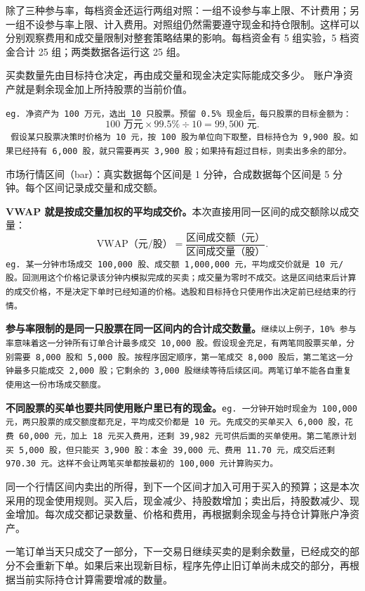 \documentclass[UTF8,fontset=fandol,11pt,a4paper]{ctexart}
\begin{document}
\normalsize
除了三种参与率，每档资金还运行两组对照：一组不设参与率上限、不计费用；另一组不设参与率上限、计入费用。对照组仍然需要遵守现金和持仓限制。这样可以分别观察费用和成交量限制对整套策略结果的影响。每档资金有 5 组实验，5 档资金合计 25 组；两类数据各运行这 25 组。




买卖数量先由目标持仓决定，再由成交量和现金决定实际能成交多少。
账户净资产就是剩余现金加上所持股票的当前价值。

\texttt{eg. 净资产为 100 万元，选出 10 只股票。预留 0.5\% 现金后，每只股票的目标金额为：
\[
100\text{ 万元}\times99.5\%\div10=99{,}500\text{ 元}.
\]
假设某只股票决策时价格为 10 元，按 100 股为单位向下取整，目标持仓为 9,900 股。如果已经持有 6,000 股，就只需要再买 3,900 股；如果持有超过目标，则卖出多余的部分。}

市场行情区间（bar）：真实数据每个区间是 1 分钟，合成数据每个区间是 5 分钟。每个区间记录成交量和成交额。

\textbf{VWAP 就是按成交量加权的平均成交价。}本次直接用同一区间的成交额除以成交量：
\[
\text{VWAP（元/股）}=
\frac{\text{区间成交额（元）}}{\text{区间成交量（股）}}.
\]
\texttt{eg. 某一分钟市场成交 100,000 股、成交额 1,000,000 元，平均成交价就是 10 元/股。回测用这个价格记录该分钟内模拟完成的买卖；成交量为零时不成交。这是区间结束后计算的成交价格，不是决定下单时已经知道的价格。选股和目标持仓只使用作出决定前已经结束的行情。}

\textbf{参与率限制的是同一只股票在同一区间内的合计成交数量。}\texttt{继续以上例子，10\% 参与率意味着这一分钟所有订单合计最多成交 10,000 股。假设现金充足，有两笔同股票买单，分别需要 8,000 股和 5,000 股。按程序固定顺序，第一笔成交 8,000 股后，第二笔这一分钟最多只能成交 2,000 股；它剩余的 3,000 股继续等待后续区间。两笔订单不能各自重复使用这一份市场成交额度。}

\textbf{不同股票的买单也要共同使用账户里已有的现金。}\texttt{eg. 一分钟开始时现金为 100,000 元，两只股票的成交额度都充足，平均成交价都是 10 元。先成交的买单买入 6,000 股，花费 60,000 元，加上 18 元买入费用，还剩 39,982 元可供后面的买单使用。第二笔原计划买 5,000 股，但只能买 3,900 股：本金 39,000 元、费用 11.70 元，成交后还剩 970.30 元。这样不会让两笔买单都按最初的 100,000 元计算购买力。}

同一个行情区间内卖出的所得，到下一个区间才加入可用于买入的预算；这是本次采用的现金使用规则。买入后，现金减少、持股数增加；卖出后，持股数减少、现金增加。每次成交都记录数量、价格和费用，再根据剩余现金与持仓计算账户净资产。

一笔订单当天只成交了一部分，下一交易日继续买卖的是剩余数量，已经成交的部分不会重新下单。如果后来出现新目标，程序先停止旧订单尚未成交的部分，再根据当前实际持仓计算需要增减的数量。
\end{document}
